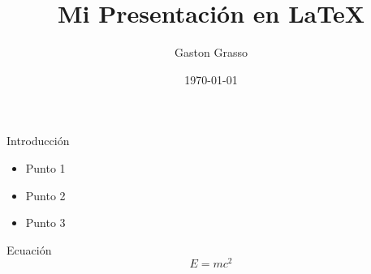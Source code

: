 \documentclass{beamer}
\title{Mi Presentación en LaTeX}
\author{Gaston Grasso}
\date{\today}
\begin{document}
\frame{\titlepage}

\begin{frame}{Introducción}
  \begin{itemize}
    \item Punto 1
    \item Punto 2
    \item Punto 3
  \end{itemize}
\end{frame}

\begin{frame}{Ecuación}
  \[
    E = mc^2
  \]
\end{frame}
\end{document}
